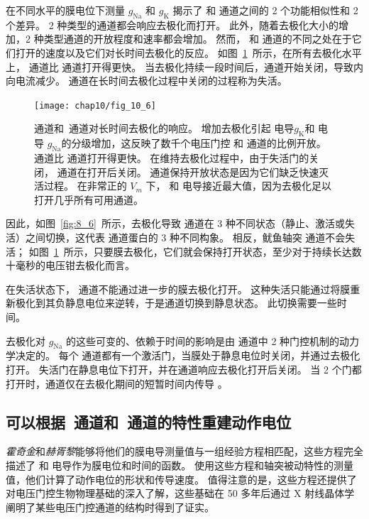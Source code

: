 在不同水平的膜电位下测量 $g_\text{Na}$ 和 $g_\text{K}$ 揭示了  和  通道之间的 2 个功能相似性和 2 个差异。
2 种类型的通道都会响应去极化而打开。
此外，随着去极化大小的增加，2 种类型通道的开放程度和速率都会增加。
然而， 和  通道的不同之处在于它们打开的速度以及它们对长时间去极化的反应。
如图~\ref{fig:10_6}~所示，在所有去极化水平上， 通道比  通道打开得更快。 
当去极化持续一段时间后，通道开始关闭，导致内向电流减少。
 通道在长时间去极化过程中关闭的过程称为失活。


\begin{figure}[htbp]
	\centering
	\texttt{[image: chap10/fig\_10\_6]}
	\caption{通道和~通道对长时间去极化的响应。
		增加去极化引起  电导$g_\text{K}$和  电导 $g_\text{Na}$的分级增加，这反映了数千个电压门控  和  通道的比例开放。
		 通道比  通道打开得更快。
		在维持去极化过程中，由于失活门的关闭， 通道在打开后关闭。
		 通道保持开放状态是因为它们缺乏快速灭活过程。
		在非常正的 $V_m$ 下， 和  电导接近最大值，因为去极化足以打开几乎所有可用通道。}
	\label{fig:10_6}
\end{figure}


因此，如图~\ref{fig:8_6}~所示，去极化导致  通道在 3 种不同状态（静止、激活或失活）之间切换，这代表  通道蛋白的 3 种不同构象。
相反，鱿鱼轴突  通道不会失活；
如图~\ref{fig:10_6}~所示，只要膜去极化，它们就会保持打开状态，至少对于持续长达数十毫秒的电压钳去极化而言。


在失活状态下， 通道不能通过进一步的膜去极化打开。
这种失活只能通过将膜重新极化到其负静息电位来逆转，于是通道切换到静息状态。
此切换需要一些时间。


去极化对 $g_\text{Na}$ 的这些可变的、依赖于时间的影响是由  通道中 2 种门控机制的动力学决定的。
每个  通道都有一个激活门，当膜处于静息电位时关闭，并通过去极化打开。
失活门在静息电位下打开，并在通道响应去极化打开后关闭。
当 2 个门都打开时，通道仅在去极化期间的短暂时间内传导 。



\subsection{可以根据~通道和~通道的特性重建动作电位}

\textit{霍奇金}和\textit{赫胥黎}能够将他们的膜电导测量值与一组经验方程相匹配，这些方程完全描述了  和  电导作为膜电位和时间的函数。
使用这些方程和轴突被动特性的测量值，他们计算了动作电位的形状和传导速度。
值得注意的是，这些方程还提供了对电压门控生物物理基础的深入了解，这些基础在 50 多年后通过 X 射线晶体学阐明了某些电压门控通道的结构时得到了证实。


